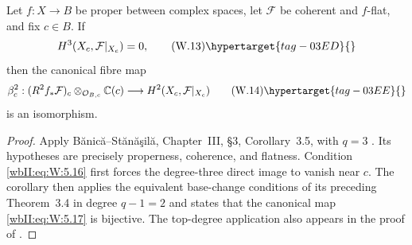 \begin{proposition}
\hypertarget{tag-03II}{}\label{wbII:prop:analytic-base-change}

Let $f:X\to B$ be proper between complex spaces, let
$\mathcal F$ be coherent and $f$-flat, and fix $c\in B$.  If
\[
H^3(X_c,\mathcal F|_{X_c})=0,
\tag{W.13}\hypertarget{tag-03ED}{}\label{wbII:eq:W:5.16}
\]
then the canonical fibre map
\[
\beta_c^2:
(R^2f_*\mathcal F)_c\otimes_{\mathcal O_{B,c}}\mathbb C(c)
\longrightarrow H^2(X_c,\mathcal F|_{X_c})
\tag{W.14}\hypertarget{tag-03EE}{}\label{wbII:eq:W:5.17}
\]
is an isomorphism.
\end{proposition}



\begin{proof}
Apply B\u{a}nic\u{a}--St\u{a}n\u{a}\c{s}il\u{a},
Chapter~III, \S3, Corollary~3.5, with $q=3$
\cite[pp.~120--121]{BS76push}.  Its hypotheses are precisely
properness, coherence, and flatness.  Condition \eqref{wbII:eq:W:5.16} first forces the
degree-three direct image to vanish near $c$.  The corollary then applies the
equivalent base-change conditions of its preceding Theorem~3.4 in degree
$q-1=2$ and states that the canonical map \eqref{wbII:eq:W:5.17} is bijective.  The top-degree application also appears in the proof of
\cite[Lemma~1.5(c), p.~80]{CDP98}.

\end{proof}